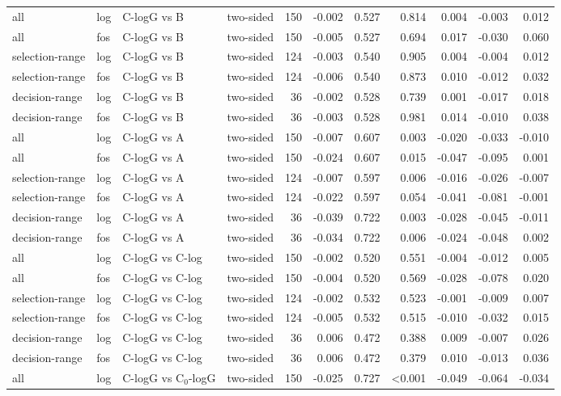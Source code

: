 \begin{longtable}{llllrrrrrrr}
all & log & C-logG vs B & two-sided & 150 & -0.002 & 0.527 & 0.814 & 0.004 & -0.003 & 0.012 \\
all & fos & C-logG vs B & two-sided & 150 & -0.005 & 0.527 & 0.694 & 0.017 & -0.030 & 0.060 \\
selection-range & log & C-logG vs B & two-sided & 124 & -0.003 & 0.540 & 0.905 & 0.004 & -0.004 & 0.012 \\
selection-range & fos & C-logG vs B & two-sided & 124 & -0.006 & 0.540 & 0.873 & 0.010 & -0.012 & 0.032 \\
decision-range & log & C-logG vs B & two-sided & 36 & -0.002 & 0.528 & 0.739 & 0.001 & -0.017 & 0.018 \\
decision-range & fos & C-logG vs B & two-sided & 36 & -0.003 & 0.528 & 0.981 & 0.014 & -0.010 & 0.038 \\
all & log & C-logG vs A & two-sided & 150 & -0.007 & 0.607 & 0.003 & -0.020 & -0.033 & -0.010 \\
all & fos & C-logG vs A & two-sided & 150 & -0.024 & 0.607 & 0.015 & -0.047 & -0.095 & 0.001 \\
selection-range & log & C-logG vs A & two-sided & 124 & -0.007 & 0.597 & 0.006 & -0.016 & -0.026 & -0.007 \\
selection-range & fos & C-logG vs A & two-sided & 124 & -0.022 & 0.597 & 0.054 & -0.041 & -0.081 & -0.001 \\
decision-range & log & C-logG vs A & two-sided & 36 & -0.039 & 0.722 & 0.003 & -0.028 & -0.045 & -0.011 \\
decision-range & fos & C-logG vs A & two-sided & 36 & -0.034 & 0.722 & 0.006 & -0.024 & -0.048 & 0.002 \\
all & log & C-logG vs C-log & two-sided & 150 & -0.002 & 0.520 & 0.551 & -0.004 & -0.012 & 0.005 \\
all & fos & C-logG vs C-log & two-sided & 150 & -0.004 & 0.520 & 0.569 & -0.028 & -0.078 & 0.020 \\
selection-range & log & C-logG vs C-log & two-sided & 124 & -0.002 & 0.532 & 0.523 & -0.001 & -0.009 & 0.007 \\
selection-range & fos & C-logG vs C-log & two-sided & 124 & -0.005 & 0.532 & 0.515 & -0.010 & -0.032 & 0.015 \\
decision-range & log & C-logG vs C-log & two-sided & 36 & 0.006 & 0.472 & 0.388 & 0.009 & -0.007 & 0.026 \\
decision-range & fos & C-logG vs C-log & two-sided & 36 & 0.006 & 0.472 & 0.379 & 0.010 & -0.013 & 0.036 \\
all & log & C-logG vs C$_0$-logG & two-sided & 150 & -0.025 & 0.727 & <0.001 & -0.049 & -0.064 & -0.034 \\

\end{longtable}
